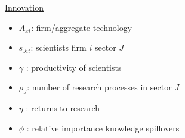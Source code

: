 \documentclass[11pt,aspectratio=169]{beamer}
\begin{document}
\begin{frame}{\hyperlink{modma}{Innovation}}
\begin{minipage}[t!]{0.43\textwidth}
	\vspace{0mm}
	\begin{itemize}
		\item[] $A_{xt}$: firm/aggregate technology
		\vspace{-2mm}		
		\item[] $s_{Jit}$: scientists firm $i$ sector $J$
		\vspace{-2mm}
		\item[] $\gamma$ : productivity of scientists
	\end{itemize}
\end{minipage}
\vspace{-5mm}
\begin{minipage}[t!]{0.55\textwidth}
	\vspace{0mm}
	\begin{itemize}	
		\item[] {$\rho_J$: number of research processes in sector $J$}
		\vspace{-2mm}			
		\item[] $\eta$ : returns to research
		\vspace{-2mm}			
		\item[] $\phi$ : relative importance knowledge spillovers
	\end{itemize}
\end{minipage}
\end{frame}
\end{document}

